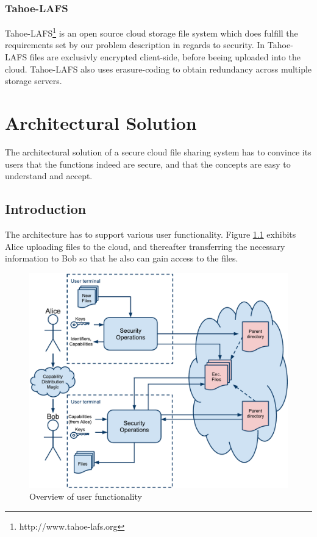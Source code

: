 \documentclass[english,12pt,a4paper]{book}
\begin{document}
\subsection{Tahoe-LAFS}
Tahoe-\ac{LAFS}\footnote{http://www.tahoe-lafs.org} is an open source
cloud storage file system which does fulfill the requirements set by our
problem description in regards to security. In Tahoe-\ac{LAFS} files are
exclusivly encrypted client-side, before beeing uploaded into the cloud.
Tahoe-\ac{LAFS} also uses erasure-coding to obtain redundancy across multiple
storage servers.  


\chapter{Architectural Solution}
\label{chap:AS}

The architectural solution of a secure cloud file sharing system has to convince
its users that the functions indeed are secure, and that the concepts are easy
to understand and accept.

\section{Introduction}

The architecture has to support various user functionality. Figure
\ref{fig:AS:overview} exhibits Alice uploading files to the cloud, and
thereafter transferring the necessary information to Bob so that he also can
gain access to the files.

\begin{figure}[h!]
    \centering
    \includegraphics[width=\columnwidth]{ArchitectureOverview.pdf}
    \caption{Overview of user functionality}
    \label{fig:AS:overview}
\end{figure}
\end{document}

